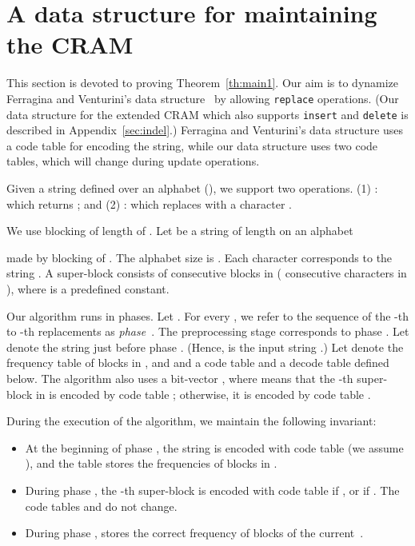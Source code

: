 \documentclass{llncs}
\begin{document}
\section{A data structure for maintaining the CRAM}
\label{sec:replace}

This section is devoted to proving Theorem~\ref{th:main1}.
Our aim is to dynamize Ferragina and Venturini's
data structure~\cite{FerVen07b} by allowing \texttt{replace} operations.
(Our data structure for the extended CRAM which also supports
\texttt{insert} and \texttt{delete} is described in Appendix~\ref{sec:indel}.)
Ferragina and Venturini's data structure uses a code table for encoding
the string, while our data structure uses two code tables, which will
change during update operations.

Given a string  defined over an alphabet  (),
we support two operations. 
(1) : which returns ; and 
(2) : which replaces  with a character .

We use blocking of length  of .
Let  be a string of length  on an alphabet 

made by blocking of .
The alphabet size is .
Each character  corresponds to the string .
A super-block consists of  consecutive blocks in 
( consecutive characters in ),
where  is a predefined constant.

Our algorithm runs in phases.
Let .
For every , we refer to the sequence of the -th to
-th replacements as \emph{phase~}.
The preprocessing stage corresponds to phase .
Let  denote the string just before phase .  (Hence,  is the input string .)
Let  denote the frequency table of blocks  
in , 
and  and  a code table and a decode table defined below.
The algorithm also uses a bit-vector ,
where  means that the -th super-block in 
is encoded by code table ; otherwise, it is encoded
by code table .

During the execution of the algorithm, we maintain the following invariant:
\begin{itemize}
\item[{\raise0.3pt\hbox{}}]
At the beginning of phase , the string  is encoded with
code table  (we assume ), and
the table  stores the frequencies of blocks in .
\item[{\raise0.3pt\hbox{}}]
During phase , the -th super-block is encoded with
code table  if , or  if .
The code tables  and  do not change.\item[{\raise0.3pt\hbox{}}]
During phase ,  stores the correct frequency of blocks
of the current~.
\end{itemize}
\end{document}
